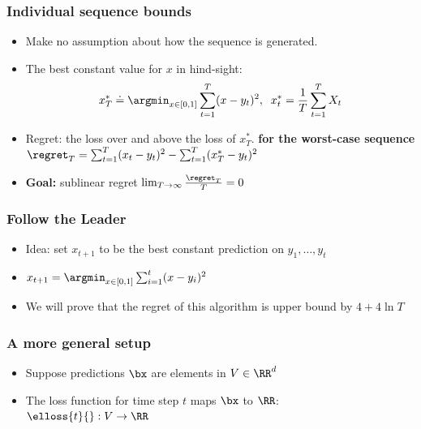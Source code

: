 \documentclass{beamer}
\begin{document}
\begin{frame}
\frametitle{Individual sequence bounds}
\begin{itemize}
\item Make no assumption about how the sequence is generated.
\item The best constant value for $x$ in hind-sight:\\
  $$x^*_T \doteq \argmin_{x \in [0,1]} \sum_{t=1}^T (x-y_t)^2,\;\; x^*_t=\frac{1}{T}
  \sum_{t=1}^T X_t$$ 
\item Regret: the loss over and above the loss of $x^*_T$. {\bf for the
    worst-case sequence}
  $ \regret_T = \sum_{t=1}^T (x_t-y_t)^2 - \sum_{t=1}^T (x^*_T-y_t)^2
  $
\item {\bf Goal:} sublinear regret $\lim_{T \to \infty} \frac{\regret_T}{T} = 0$
\end{itemize}
\end{frame}

\begin{frame}
\frametitle{Follow the Leader}
\begin{itemize}
\item Idea: set $x_{t+1}$ to be the best constant prediction on $y_1,\ldots,y_t$
\item 
  $x_{t+1} = \argmin_{x \in [0,1]} \sum_{i=1}^t (x-y_i)^2$ 
\item We will prove that the regret of this algorithm is upper bound
  by $4+4 \ln T$
\end{itemize}
\end{frame}


\begin{frame}
\frametitle{A more general setup}
\begin{itemize}
\item Suppose predictions $\bx$ are elements in $V \in \RR^d$
\item The loss function for time step $t$ maps $\bx$ to $\RR$:\\
  $\elloss{t}{}: V \to \RR$
\end{itemize}
\end{frame}
\end{document}
